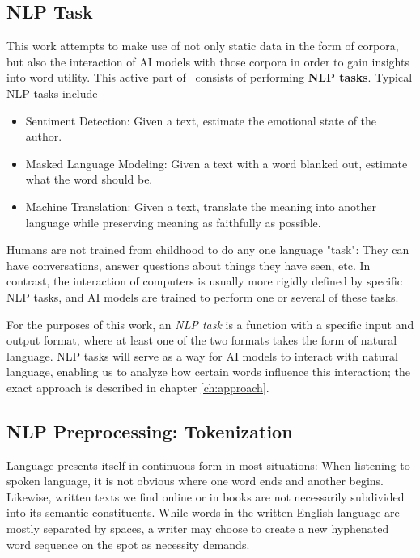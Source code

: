 \subsection{NLP Task}
This work attempts to make use of not only static data in the form of corpora, but also the interaction of AI models with those corpora in order to gain insights into word utility.
This active part of \NLP\ consists of performing \textbf{NLP tasks}.
Typical NLP tasks include \cite{jurafskySpeechLanguageProcessing2025}

\begin{itemize}
	\item Sentiment Detection: Given a text, estimate the emotional state of the author.
	\item Masked Language Modeling: Given a text with a word blanked out, estimate what the word should be.
	\item Machine Translation: Given a text, translate the meaning into another language while preserving meaning as faithfully as possible.
\end{itemize}


Humans are not trained from childhood to do any one language "task":
They can have conversations, answer questions about things they have seen, etc.
In contrast, the interaction of computers is usually more rigidly defined by specific NLP tasks, and AI models are trained to perform one or several of these tasks.

For the purposes of this work, an \textit{NLP task} is a function with a specific input and output format, where at least one of the two formats takes the form of natural language.
NLP tasks will serve as a way for AI models to interact with natural language, enabling us to analyze how certain words influence this interaction; the exact approach is described in chapter \ref{ch:approach}.


\subsection{NLP Preprocessing: Tokenization}
Language presents itself in continuous form in most situations:
When listening to spoken language, it is not obvious where one word ends and another begins.
Likewise, written texts we find online or in books are not necessarily subdivided into its semantic constituents.
While words in the written English language are mostly separated by spaces, a writer may choose to create a new hyphenated word sequence on the spot as necessity demands.

